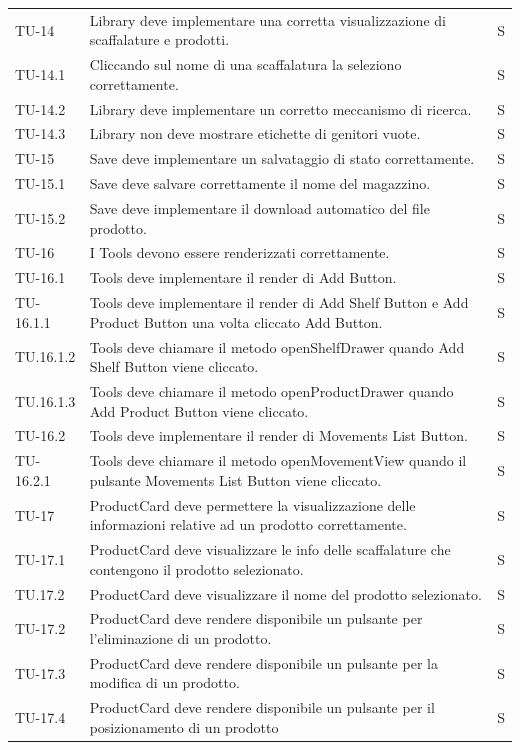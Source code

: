 \begin{xltabular}{0.9\textwidth}{X | p{0.6\textwidth} | p{0.1\textwidth} }
    TU-14 & Library deve implementare una corretta visualizzazione di scaffalature e prodotti. & S\\
    TU-14.1 & Cliccando sul nome di una scaffalatura la seleziono correttamente. & S\\
    TU-14.2 & Library deve implementare un corretto meccanismo di ricerca. & S\\
    TU-14.3 &  Library non deve mostrare etichette di genitori vuote. & S\\
    TU-15 & Save deve implementare un salvataggio di stato correttamente. & S\\
    TU-15.1 & Save deve salvare correttamente il nome del magazzino. & S\\
    TU-15.2 & Save deve implementare il download automatico del file prodotto. & S\\
    TU-16 & I Tools devono essere renderizzati correttamente. & S\\
    TU-16.1 & Tools deve implementare il render di Add Button. & S\\
    TU-16.1.1 & Tools deve implementare il render di Add Shelf Button e Add Product Button una volta cliccato Add Button. & S\\
    TU.16.1.2 & Tools deve chiamare il metodo openShelfDrawer quando Add Shelf Button viene cliccato. & S\\
    TU.16.1.3 & Tools deve chiamare il metodo openProductDrawer quando Add Product Button viene cliccato. & S\\
    TU-16.2 & Tools deve implementare il render di Movements List Button. &S \\
    TU-16.2.1 & Tools deve chiamare il metodo openMovementView  quando il pulsante Movements List Button viene cliccato. & S\\
    TU-17 & ProductCard deve permettere la visualizzazione delle informazioni relative ad un prodotto correttamente. &S\\
    TU-17.1 & ProductCard deve visualizzare le info delle scaffalature che contengono il prodotto selezionato. & S\\
    TU.17.2 & ProductCard deve visualizzare il nome del prodotto selezionato. &S\\
    TU-17.2 & ProductCard deve rendere disponibile un pulsante per l'eliminazione di un prodotto. &S\\
    TU-17.3 & ProductCard deve rendere disponibile un pulsante per la modifica di un prodotto.&S\\
    TU-17.4 & ProductCard deve rendere disponibile un pulsante per il posizionamento di un prodotto &S\\

\end{xltabular}
